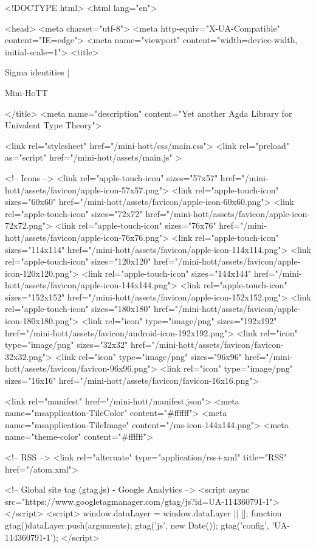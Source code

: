 <!DOCTYPE html>
<html lang="en">

<head>
  <meta charset="utf-8">
  <meta http-equiv="X-UA-Compatible" content="IE=edge">
  <meta name="viewport" content="width=device-width, initial-scale=1">
  <title>
    
      
        Sigma identities |
      
        Mini-HoTT
    
  </title>
  <meta name="description" content="Yet another Agda Library for Univalent Type Theory">

  <link rel="stylesheet" href="/mini-hott/css/main.css">
  <link rel="preload" as="script" href="/mini-hott/assets/main.js" >

  <!-- Icons -->
  <link rel="apple-touch-icon" sizes="57x57" href="/mini-hott/assets/favicon/apple-icon-57x57.png">
  <link rel="apple-touch-icon" sizes="60x60" href="/mini-hott/assets/favicon/apple-icon-60x60.png">
  <link rel="apple-touch-icon" sizes="72x72" href="/mini-hott/assets/favicon/apple-icon-72x72.png">
  <link rel="apple-touch-icon" sizes="76x76" href="/mini-hott/assets/favicon/apple-icon-76x76.png">
  <link rel="apple-touch-icon" sizes="114x114" href="/mini-hott/assets/favicon/apple-icon-114x114.png">
  <link rel="apple-touch-icon" sizes="120x120" href="/mini-hott/assets/favicon/apple-icon-120x120.png">
  <link rel="apple-touch-icon" sizes="144x144" href="/mini-hott/assets/favicon/apple-icon-144x144.png">
  <link rel="apple-touch-icon" sizes="152x152" href="/mini-hott/assets/favicon/apple-icon-152x152.png">
  <link rel="apple-touch-icon" sizes="180x180" href="/mini-hott/assets/favicon/apple-icon-180x180.png">
  <link rel="icon" type="image/png" sizes="192x192"  href="/mini-hott/assets/favicon/android-icon-192x192.png">
  <link rel="icon" type="image/png" sizes="32x32" href="/mini-hott/assets/favicon/favicon-32x32.png">
  <link rel="icon" type="image/png" sizes="96x96" href="/mini-hott/assets/favicon/favicon-96x96.png">
  <link rel="icon" type="image/png" sizes="16x16" href="/mini-hott/assets/favicon/favicon-16x16.png">

  <link rel="manifest" href="/mini-hott/manifest.json">
  <meta name="msapplication-TileColor" content="#ffffff">
  <meta name="msapplication-TileImage" content="/ms-icon-144x144.png">
  <meta name="theme-color" content="#ffffff">

  <!-- RSS -->
  <link rel="alternate" type="application/rss+xml" title="RSS" href="/atom.xml">

  <!-- Global site tag (gtag.js) - Google Analytics -->
  <script async src="https://www.googletagmanager.com/gtag/js?id=UA-114360791-1"></script>
  <script>
    window.dataLayer = window.dataLayer || [];
    function gtag(){dataLayer.push(arguments);}
    gtag('js', new Date());
    gtag('config', 'UA-114360791-1');
  </script>


